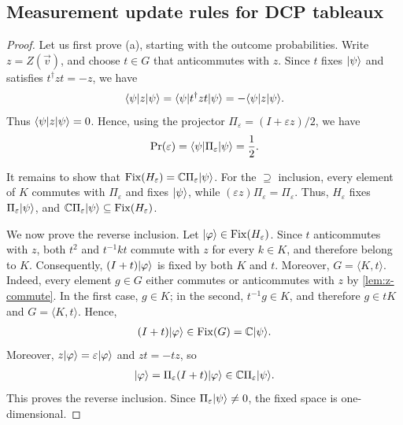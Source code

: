 \subsection{Measurement update rules for DCP tableaux}
\label{appendix:tableau-update-measurements}

\begin{dcpzmeasurementrestatement}
\dcpZMeasurementUpdateStatement
\end{dcpzmeasurementrestatement}

\begin{proof}
    Let us first prove (a), starting with the outcome probabilities.
    Write $z=Z(\vec v)$, and choose $t\in G$ that anticommutes with $z$.
    Since $t$ fixes $|\psi\rangle$ and satisfies $t^\dagger zt=-z$, we have
    \begin{align}
        \langle\psi|z|\psi\rangle
        =\langle\psi|t^\dagger zt|\psi\rangle
        =-\langle\psi|z|\psi\rangle.
    \end{align}
    Thus $\langle\psi|z|\psi\rangle=0$.
    Hence, using the projector
    $\Pi_\varepsilon=(I+\varepsilon z)/2$, we have
    \begin{align}
        \Pr(\varepsilon)
        =\langle\psi|\Pi_\varepsilon|\psi\rangle
        =\frac12.
    \end{align}

    It remains to show that $\operatorname{Fix}(H_\varepsilon)=\mathbb{C}\Pi_\varepsilon|\psi\rangle$.
    For the $\supseteq$ inclusion, every element of $K$ commutes with $\Pi_\varepsilon$ and fixes $|\psi\rangle$, while $(\varepsilon z)\Pi_\varepsilon=\Pi_\varepsilon$.
    Thus, $H_\varepsilon$ fixes $\Pi_\varepsilon|\psi\rangle$, and $\mathbb{C}\Pi_\varepsilon|\psi\rangle\subseteq\operatorname{Fix}(H_\varepsilon)$.

    We now prove the reverse inclusion.
    Let $|\varphi\rangle\in\operatorname{Fix}(H_\varepsilon)$.
    Since $t$ anticommutes with $z$, both $t^2$ and $t^{-1}kt$ commute with $z$ for every $k\in K$, and therefore belong to $K$.
    Consequently, $(I+t)|\varphi\rangle$ is fixed by both $K$ and $t$.
    Moreover, $G=\langle K,t\rangle$.
    Indeed, every element $g\in G$ either commutes or anticommutes with $z$ by \cref{lem:z-commute}.
    In the first case, $g\in K$; in the second, $t^{-1}g\in K$, and therefore $g\in tK$ and $G=\langle K,t\rangle$.
    Hence,
    \begin{align}
        (I+t)|\varphi\rangle\in\operatorname{Fix}(G)=\mathbb{C}|\psi\rangle.
    \end{align}
    Moreover, $z|\varphi\rangle=\varepsilon|\varphi\rangle$ and $zt=-tz$, so
    \begin{align}
        |\varphi\rangle
        =\Pi_\varepsilon(I+t)|\varphi\rangle
        \in\mathbb{C}\Pi_\varepsilon|\psi\rangle.
    \end{align}
    This proves the reverse inclusion.
    Since $\Pi_\varepsilon|\psi\rangle\neq 0$, the fixed space is one-dimensional.


\end{proof}
